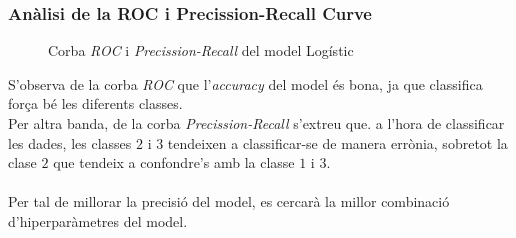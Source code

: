 \documentclass[a4paper, 11pt]{article}
\begin{document}
\subsubsection{Anàlisi de la ROC i Precission-Recall Curve} \label{ROC_LOGISTIC}
\begin{figure}[h]
\centering
    \caption{Corba \textit{ROC} i \textit{Precission-Recall} del model Logístic}
    \label{fig:my_label}
\end{figure}
\hspace{-1.6em}S'observa de la corba \textit{ROC} que l'\textit{accuracy} del model és bona, ja que classifica força bé les diferents classes.\\
Per altra banda, de la corba \textit{Precission-Recall} s'extreu que. a l'hora de classificar les dades, les classes $2$ i $3$ tendeixen a classificar-se de manera errònia, sobretot la clase $2$ que tendeix a confondre's amb la classe $1$ i $3$.\\\\
Per tal de millorar la precisió del model, es cercarà la millor combinació d'hiperparàmetres del model.
\newpage
\end{document}
